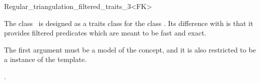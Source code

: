 

\begin{ccRefClass}{Regular_triangulation_filtered_traits_3<FK>}

\ccDefinition
  
The class \ccRefName\ is designed as a traits class for the
class . 
Its difference with  is that it
provides filtered predicates which are meant to be fast and exact.

The first argument  must be a model of the  concept, and
it is also restricted to be a instance of the  template.


\ccIsModel
{}


\ccSeeAlso

.

\end{ccRefClass}
